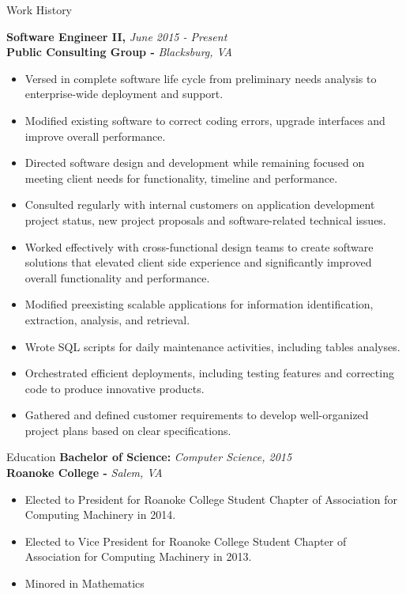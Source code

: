 \documentclass{resume} %
\begin{document}
\begin{rSection}{Work History}

{\bf Software Engineer II, }{\em June 2015 - Present} 
\\
{\bf Public Consulting Group -  }{\em Blacksburg, VA}
\begin{itemize}
\item Versed in complete software life cycle from preliminary needs analysis to enterprise-wide deployment and support.
\item Modified existing software to correct coding errors, upgrade interfaces and improve overall performance.
\item Directed software design and development while remaining focused on meeting client needs for functionality, timeline and performance.
\item Consulted regularly with internal customers on application development project status, new project proposals and software-related technical issues.
\item Worked effectively with cross-functional design teams to create software solutions that elevated client side experience and significantly improved overall functionality and performance.
\item Modified preexisting scalable applications for information identification, extraction, analysis, and retrieval.
\item Wrote SQL scripts for daily maintenance activities, including tables analyses.
\item Orchestrated efficient deployments, including testing features and correcting code to produce innovative products.
\item Gathered and defined customer requirements to develop well-organized project plans based on clear specifications.
\end{itemize}
\end{rSection}

\begin{rSection}{Education}
{\bf Bachelor of Science: }{\em Computer Science, 2015} 
\\
{\bf Roanoke College -  }{\em Salem, VA}
\begin{itemize}
\item Elected to President for Roanoke College Student Chapter of Association for Computing Machinery in 2014.
\item Elected to Vice President for Roanoke College Student Chapter of Association for Computing Machinery in 2013.
\item Minored in Mathematics
\end{itemize}
\end{rSection}
\end{document}
